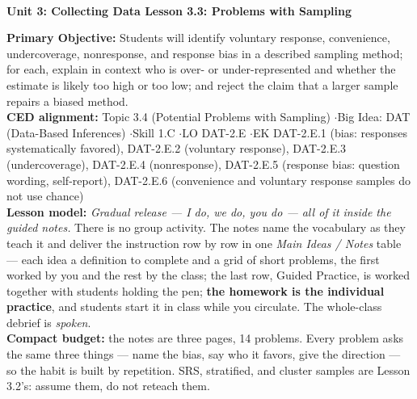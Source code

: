 \documentclass[10pt]{article}
\newcommand{\UnitNumberName}{Unit 3: Collecting Data \quad}
\newcommand{\LessonNumberName}{Lesson 3.3: Problems with Sampling}
\begin{document}
\begin{center}
    {\Large\bfseries \CourseName \\
    {\small\bfseries \UnitNumberName \LessonNumberName}}
\end{center}

\begin{tcolorbox}[colback=sky, colframe=navy, boxrule=0.9pt, arc=2mm,
    left=2mm, right=2mm, top=1.5mm, bottom=1.5mm]
    \textbf{Primary Objective:} Students will identify voluntary response, convenience,
    undercoverage, nonresponse, and response bias in a described sampling method; for each,
    explain in context who is over- or under-represented and whether the estimate is likely
    too high or too low; and reject the claim that a larger sample repairs a biased method.
    \\[2pt]
    \textbf{CED alignment:} Topic 3.4 (Potential Problems with Sampling) \quad$\cdot$\quad Big
    Idea: DAT (Data-Based Inferences) \quad$\cdot$\quad Skill 1.C \quad$\cdot$\quad LO DAT-2.E
    \quad$\cdot$\quad EK DAT-2.E.1 (bias: responses systematically favored), DAT-2.E.2
    (voluntary response), DAT-2.E.3 (undercoverage), DAT-2.E.4 (nonresponse), DAT-2.E.5
    (response bias: question wording, self-report), DAT-2.E.6 (convenience and voluntary
    response samples do not use chance)
    \\[2pt]
    \textbf{Lesson model:} \emph{Gradual release --- I do, we do, you do --- all of it inside
    the guided notes.} There is no group activity. The notes name the vocabulary as they teach
    it and deliver the instruction row by row in one \emph{Main Ideas / Notes} table --- each
    idea a definition to complete and a grid of short problems, the first worked by you and the
    rest by the class; the last row, Guided Practice, is worked together with students holding
    the pen; \textbf{the homework is the individual practice}, and students start it in class
    while you circulate. The whole-class debrief is \emph{spoken}.
    \\[2pt]
    \textbf{Compact budget:} the notes are three pages, 14 problems. Every problem asks the same
    three things --- name the bias, say who it favors, give the direction --- so the habit is
    built by repetition. SRS, stratified, and cluster samples are Lesson 3.2's: assume them, do
    not reteach them.
\end{tcolorbox}
\end{document}
